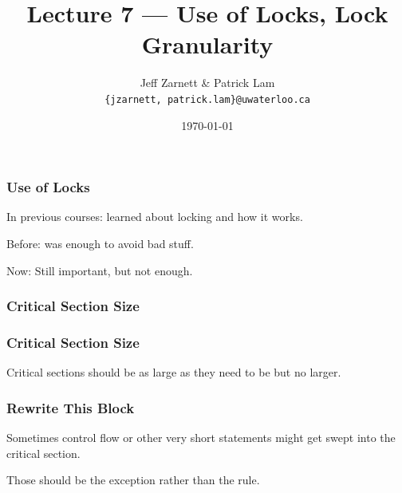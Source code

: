 
\usepackage{multirow}

\title{Lecture 7 --- Use of Locks, Lock Granularity }

\author{Jeff Zarnett \& Patrick Lam \\ \small \texttt{\{jzarnett, patrick.lam\}@uwaterloo.ca}}
\date{\today}




\begin{frame}
  \titlepage

 \end{frame}




\begin{frame}
\frametitle{Use of Locks}
\begin{changemargin}{2cm}
\vspace*{-3em}
In previous courses: learned about locking and how it works.

Before: was enough to avoid bad stuff.

Now: Still important, but not enough.
\end{changemargin}

\end{frame}


\begin{frame}
\frametitle{Critical Section Size}

  \begin{center}
    
  \end{center}

\end{frame}

\begin{frame}
\frametitle{Critical Section Size}

  \begin{center}
    
  \end{center}

Critical sections should be as large as they need to be but no larger. 

\end{frame}


\begin{frame}
\frametitle{Rewrite This Block}

  \begin{center}
    
  \end{center}

Sometimes control flow or other very short statements might get swept into the critical section.

Those should be the exception rather than the rule.

\end{frame}


